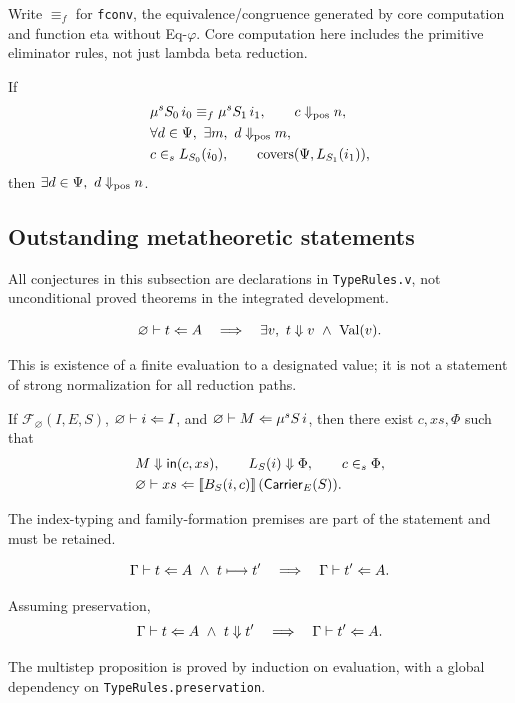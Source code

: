 Write $\equiv_f$ for \texttt{fconv}, the equivalence/congruence generated by core computation and function eta without Eq-$\varphi$. Core computation here includes the primitive eliminator rules, not just lambda beta reduction.
\begin{theorem}
If
\begin{align*}
&\mu^s S_0\,i_0\equiv_f\mu^s S_1\,i_1,\qquad c\Downarrow_{\rm pos}n,\\
&\forall d\in\Psi,\ \exists m,\ d\Downarrow_{\rm pos}m,\\
&c\in_s L_{S_0}(i_0),\qquad\operatorname{covers}(\Psi,L_{S_1}(i_1)),
\end{align*}
then $\exists d\in\Psi,\ d\Downarrow_{\rm pos}n$.
\end{theorem}

\subsection{Outstanding metatheoretic statements}
All conjectures in this subsection are declarations in \texttt{TypeRules.v}, not unconditional proved theorems in the integrated development.
\begin{conjecture}[Normalization]
\[
 \varnothing\vdash t\Leftarrow A\quad\Longrightarrow\quad
 \exists v,\ t\Downarrow v\ \land\ \operatorname{Val}(v).
\]
\end{conjecture}
\noindent This is existence of a finite evaluation to a designated value; it is not a statement of strong normalization for all reduction paths.

\begin{conjecture}
If $\mathcal F_{\varnothing}(I,E,S)$, $\varnothing\vdash i\Leftarrow I$, and $\varnothing\vdash M\Leftarrow \mu^s S\,i$, then there exist $c,xs,\Phi$ such that
\begin{align*}
&M\Downarrow\mathsf{in}(c,xs),\qquad L_S(i)\Downarrow\Phi,\qquad c\in_s\Phi,\\
&\varnothing\vdash xs\Leftarrow \llbracket B_S(i,c)\rrbracket\,(\mathsf{Carrier}_E(S)).
\end{align*}
\end{conjecture}
\noindent The index-typing and family-formation premises are part of the statement and must be retained.

\begin{conjecture}
\[
 \Gamma\vdash t\Leftarrow A\ \land\ t\longmapsto t'
 \quad\Longrightarrow\quad\Gamma\vdash t'\Leftarrow A.
\]
\end{conjecture}
\begin{proposition}
Assuming preservation,
\[
 \Gamma\vdash t\Leftarrow A\ \land\ t\Downarrow t'
 \quad\Longrightarrow\quad\Gamma\vdash t'\Leftarrow A.
\]
\end{proposition}
\noindent The multistep proposition is proved by induction on evaluation, with a global dependency on \texttt{TypeRules.preservation}.

